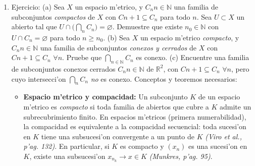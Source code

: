 \documentclass[a4paper,11pt]{article}  %
\begin{document}
\begin{enumerate}
\begin{itemize}
\item \textbf{Propiedad $T_1$ (Hausdorff implica $T_1$):} En cualquier espacio $T_2$, los puntos individuales son cerrados (lo que es la definici'on de $T_1$) \emph{(Steen, p'ag. 1)}. Se usa este hecho para demostrar cerradura de $A$: dado $x\in X\setminus A$, como $A$ es retracto existe $r(x)\in A$ con $r(x)\neq x$ (porque $x\notin A$ pero $r(x)\in A$). Si $X$ es Hausdorff, existen entornos abiertos disjuntos $U$ de $x$ y $V$ de $r(x)$. Entonces $U$ queda libre de puntos de $A$ (ya que $V$ cubre a $r(x)$ y no interseca $U$), de donde $U\subset X\setminus A$. As'i, cada $x\notin A$ tiene un entorno que no toca $A$, implicando que $X\setminus A$ es abierto y $A$ es cerrado.
\item \textbf{Unicidad del l'imite en espacios Hausdorff:} Una formulaci'on alternativa en t'erminos de secuencias (o redes) es 'util: en un espacio Hausdorff, cualquier sucesi'on converge a lo sumo a un 'unico l'imite \emph{(Croom, p'ag. 93)}. Si $A$ no fuese cerrado, existir'ia un punto $x\in \overline{A}\setminus A$ (un l'imite de puntos de $A$ que no pertenece a $A$). Tomando una sucesi'on $(a_n)\subset A$ con $a_n\to x$, por continuidad $r(a_n)=a_n\to r(x)$ (ya que $r$ es continua y $a_n\in A$ implica $r(a_n)=a_n$). Tendr'iamos $a_n\to x$ y $a_n\to r(x)$ con $x\neq r(x)$, contradiciendo la unicidad del l'imite en un espacio $T_2$. Esto confirma que $A$ debe ser cerrado en $X$.
\end{itemize} \item Ejercicio: (a) Sea $X$ un espacio m'etrico, y ${C_n}{n\in\mathbb{N}}$ una familia de subconjuntos \emph{compactos} de $X$ con $C{n+1}\subseteq C_n$ para todo $n$. Sea $U\subset X$ un abierto tal que $U\cap \big(\bigcap_{n} C_n\big)=\varnothing$. Demuestre que existe $n_0\in\mathbb{N}$ con $U\cap C_n=\varnothing$ para todo $n\ge n_0$.
(b) Sea $X$ un espacio m'etrico \emph{compacto}, y ${C_n}{n\in\mathbb{N}}$ una familia de subconjuntos \emph{conexos y cerrados} de $X$ con $C{n+1}\subseteq C_n$ $\forall n$. Pruebe que $\bigcap_{n\in\mathbb{N}} C_n$ es conexo.
(c) Encuentre una familia de subconjuntos conexos cerrados ${C_n}{n\in\mathbb{N}}$ de $\mathbb{R}^2$, con $C{n+1}\subseteq C_n$ $\forall n$, pero cuyo intersecci'on $\bigcap_n C_n$ \emph{no} es conexo. Conceptos y teoremos necesarios:
\begin{itemize}
\item \textbf{Espacio m'etrico y compacidad:} Un subconjunto $K$ de un espacio m'etrico es \emph{compacto} si toda familia de abiertos que cubre a $K$ admite un subrecubrimiento finito. En espacios m'etricos (primera numerabilidad), la compacidad es equivalente a la compacidad secuencial: toda sucesi'on en $K$ tiene una subsucesi'on convergente a un punto de $K$ \emph{(Viro et al., p'ag. 132)}. En particular, si $K$ es compacto y $(x_n)$ es una sucesi'on en $K$, existe una subsucesi'on $x_{n_k}\to x\in K$ \emph{(Munkres, p'ag. 95)}.

\end{itemize}
\end{enumerate}
\end{document}
